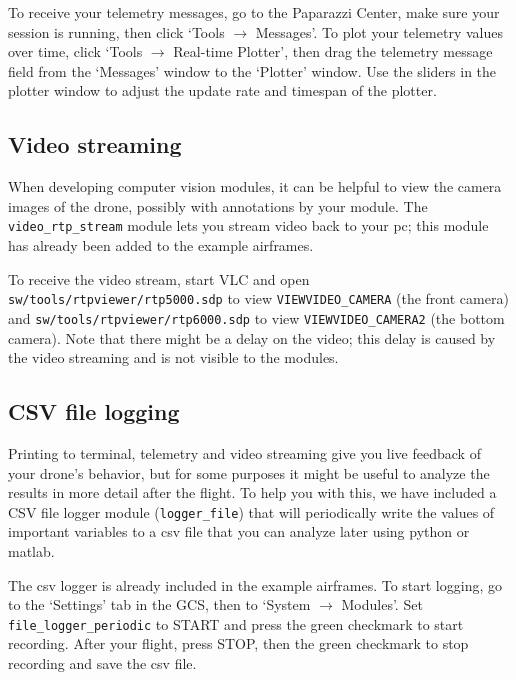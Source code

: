 \documentclass{article}
\begin{document}
To receive your telemetry messages, go to the Paparazzi Center, make sure your session is running, then click `Tools $\rightarrow$ Messages'. To plot your telemetry values over time, click `Tools $\rightarrow$ Real-time Plotter', then drag the telemetry message field from the `Messages' window to the `Plotter' window. Use the sliders in the plotter window to adjust the update rate and timespan of the plotter.


\subsection{Video streaming}
When developing computer vision modules, it can be helpful to view the camera images of the drone, possibly with annotations by your module. The \texttt{video\_rtp\_stream} module lets you stream video back to your pc; this module has already been added to the example airframes.

To receive the video stream, start VLC and open \texttt{sw/tools/rtpviewer/rtp5000.sdp} to view \texttt{VIEWVIDEO\_CAMERA} (the front camera) and \texttt{sw/tools/rtpviewer/rtp6000.sdp} to view \texttt{VIEWVIDEO\_CAMERA2} (the bottom camera). Note that there might be a delay on the video; this delay is caused by the video streaming and is not visible to the modules.


\subsection{CSV file logging}
Printing to terminal, telemetry and video streaming give you live feedback of your drone's behavior, but for some purposes it might be useful to analyze the results in more detail after the flight. To help you with this, we have included a CSV file logger module (\texttt{logger\_file}) that will periodically write the values of important variables to a csv file that you can analyze later using python or matlab.

The csv logger is already included in the example airframes. To start logging, go to the `Settings' tab in the GCS, then to `System $\rightarrow$ Modules'. Set \texttt{file\_logger\_periodic} to START and press the green checkmark to start recording. After your flight, press STOP, then the green checkmark to stop recording and save the csv file.
\end{document}
